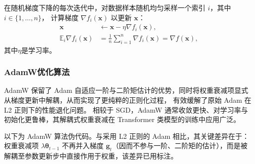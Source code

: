 在随机梯度下降的每次迭代中，对数据样本随机均匀采样一个索引 $i$，其中 $i \in\{1, \ldots, n\}$，
计算梯度 $\nabla f_i(\boldsymbol{x})$ 以更新 $\boldsymbol{x}$：
\begin{align}
    \boldsymbol{x} & \leftarrow \boldsymbol{x}-\eta \nabla f_i(\boldsymbol{x}),\\
    \mathbb{E}_{i} \nabla f_i(\boldsymbol{x}) & =\frac{1}{n} \sum_{i=1}^n \nabla f_i(\boldsymbol{x}) = \nabla f(\boldsymbol{x}),
\end{align}
其中$\eta$是学习率。\supercite{zhang2023dive}

\subsubsection{AdamW优化算法}
AdamW 保留了 Adam 自适应一阶与二阶矩估计的优势，同时将权重衰减项显式从梯度更新中解耦，从而实现了更纯粹的正则化过程，
有效缓解了原始 Adam 在 L2 正则下的性能退化问题。
相较于 SGD，AdamW 通常收敛更快、对学习率与初始化更鲁棒，其解耦式权重衰减在 Transformer 类模型的训练中应用广泛。
\supercite{loshchilovDecoupledWeightDecay2019a}

以下为 AdamW 算法伪代码。与采用 L2 正则的 Adam 相比，其关键差异在于：权重衰减项 $\lambda\boldsymbol{\theta}_{t-1}$ 不再并入梯度 $\boldsymbol{g}_t$（因而不参与一阶、二阶矩的估计），而是被解耦至参数更新步中直接作用于权重，该差异已用标注。
\begin{algorithm}[H]
\caption{AdamW 优化算法（Adam with Decoupled Weight Decay）}
\BlankLine
{}
\end{algorithm}

